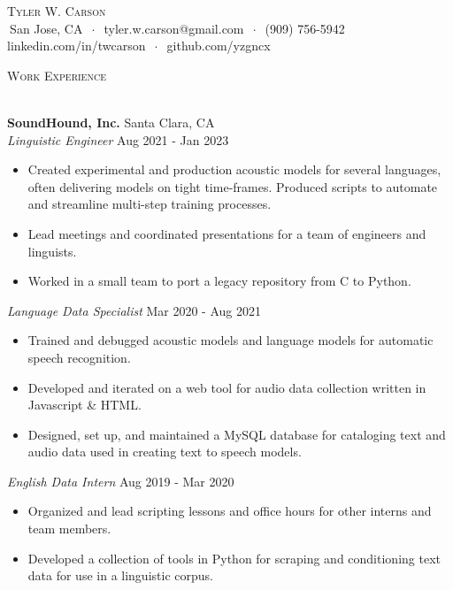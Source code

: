 \documentclass[]{article}
\newcommand{\lineunder} {
    \vspace*{-8pt} \\
    \hspace*{-18pt} \hrulefill \\
}
\newcommand{\header} [1] {
    {\hspace*{-18pt}\vspace*{6pt} \textsc{#1}}
    \vspace*{-6pt} \lineunder
}
\begin{document}
\vspace*{-40pt}


\vspace*{-10pt}
\begin{center}
	{\Huge \scshape {Tyler W. Carson}}\\
	$\ $San Jose, CA $\ \cdot\ $ tyler.w.carson@gmail.com $\ \cdot\ $ (909) 756-5942\\ linkedin.com/in/twcarson $\ \cdot\ $ github.com/yzgncx\\
\end{center}


\header{Work Experience}
\vspace{1mm}

\textbf{SoundHound, Inc.} \hfill Santa Clara, CA\\
\textit{Linguistic Engineer} \hfill Aug 2021 - Jan 2023\\
\vspace{-3mm}
\begin{itemize} \itemsep 0pt
	\item Created experimental and production acoustic models for several languages, often delivering models on tight time-frames.  Produced scripts to automate and streamline multi-step training processes.
	\item Lead meetings and coordinated presentations for a team of engineers and linguists.
	\item Worked in a small team to port a legacy repository from C to Python. 
\end{itemize}
\textit{Language Data Specialist} \hfill Mar 2020 - Aug 2021\\
\vspace{-3mm}
\begin{itemize} \itemsep 0pt
	\item Trained and debugged acoustic models and language models for automatic speech recognition.  
	\item Developed and iterated on a web tool for audio data collection written in Javascript \& HTML.
	\item Designed, set up, and maintained a MySQL database for cataloging text and audio data used in creating text to speech models.
\end{itemize}
\textit{English Data Intern} \hfill Aug 2019 - Mar 2020\\
\vspace{-3mm}
\begin{itemize} \itemsep 0pt
	\item Organized and lead scripting lessons and office hours for other interns and team members.
	\item Developed a collection of tools in Python for scraping and conditioning text data for use in a linguistic corpus.
\end{itemize}
\vspace{1mm}
\end{document}

